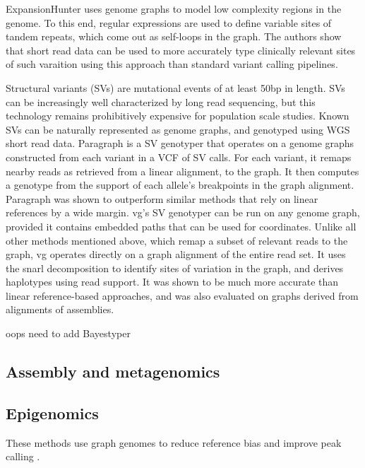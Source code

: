 ExpansionHunter \cite{dolzhenko2019expansionhunter} uses genome graphs to model low complexity regions in the genome.
To this end, regular expressions are used to define variable sites of tandem repeats, which come out as self-loops in the graph.
The authors show that short read data can be used to more accurately type clinically relevant sites of such varaition using this approach than standard variant calling pipelines.

Structural variants (SVs) are mutational events of at least 50bp in length.
SVs can be increasingly well characterized by long read sequencing, but this technology remains prohibitively expensive for population scale studies.
Known SVs can be naturally represented as genome graphs, and genotyped using WGS short read data.
Paragraph \cite{chen2019paragraph} is a SV genotyper that operates on a genome graphs constructed from each variant in a VCF of SV calls.
For each variant, it remaps nearby reads as retrieved from a linear alignment, to the graph.
It then computes a genotype from the support of each allele's breakpoints in the graph alignment.
Paragraph was shown to outperform similar methods that rely on linear references by a wide margin.
vg's SV \cite{hickey2019genotyping} genotyper can be run on any genome graph, provided it contains embedded paths that can be used for coordinates.
Unlike all other methods mentioned above, which remap a subset of relevant reads to the graph, vg operates directly on a graph alignment of the entire read set.
It uses the snarl decomposition \cite{paten2018superbubbles} to identify sites of variation in the graph, and derives haplotypes using read support.
It was shown to be much more accurate than linear reference-based approaches, and was also evaluated on graphs derived from alignments of assemblies.


oops need to add Bayestyper \cite{sibbesen2018accurate}


\subsection{Assembly and metagenomics}

\subsection{Epigenomics}

These methods use graph genomes to reduce reference bias and improve peak calling \cite{grytten2019graph}  \cite{groza2019personalized}.  

